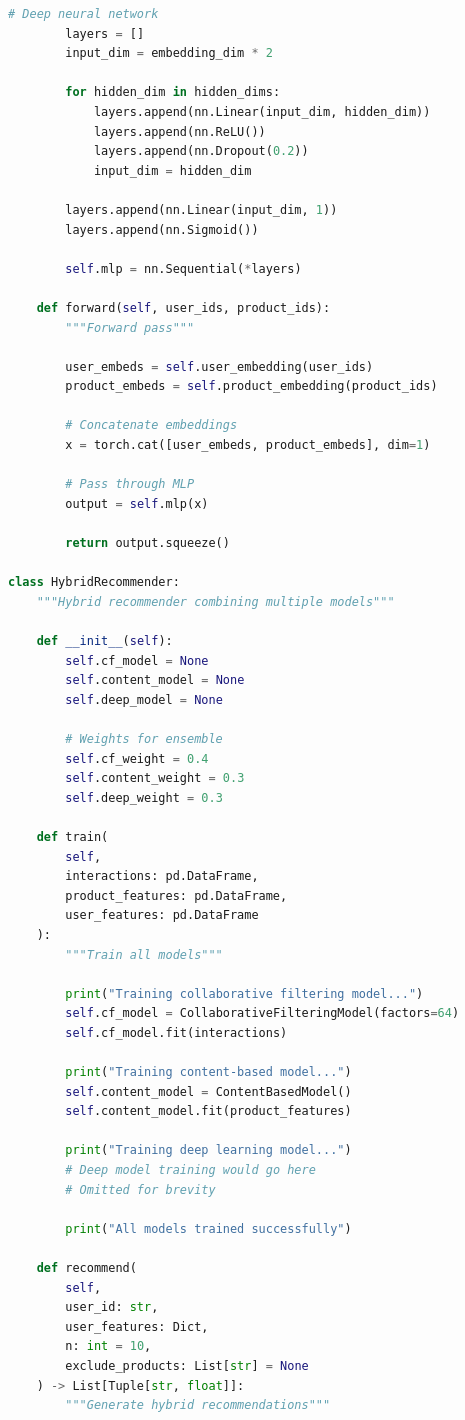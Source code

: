 \begin{lstlisting}[language=Python, caption=Hybrid Recommendation Models]
        # Deep neural network
        layers = []
        input_dim = embedding_dim * 2

        for hidden_dim in hidden_dims:
            layers.append(nn.Linear(input_dim, hidden_dim))
            layers.append(nn.ReLU())
            layers.append(nn.Dropout(0.2))
            input_dim = hidden_dim

        layers.append(nn.Linear(input_dim, 1))
        layers.append(nn.Sigmoid())

        self.mlp = nn.Sequential(*layers)

    def forward(self, user_ids, product_ids):
        """Forward pass"""

        user_embeds = self.user_embedding(user_ids)
        product_embeds = self.product_embedding(product_ids)

        # Concatenate embeddings
        x = torch.cat([user_embeds, product_embeds], dim=1)

        # Pass through MLP
        output = self.mlp(x)

        return output.squeeze()

class HybridRecommender:
    """Hybrid recommender combining multiple models"""

    def __init__(self):
        self.cf_model = None
        self.content_model = None
        self.deep_model = None

        # Weights for ensemble
        self.cf_weight = 0.4
        self.content_weight = 0.3
        self.deep_weight = 0.3

    def train(
        self,
        interactions: pd.DataFrame,
        product_features: pd.DataFrame,
        user_features: pd.DataFrame
    ):
        """Train all models"""

        print("Training collaborative filtering model...")
        self.cf_model = CollaborativeFilteringModel(factors=64)
        self.cf_model.fit(interactions)

        print("Training content-based model...")
        self.content_model = ContentBasedModel()
        self.content_model.fit(product_features)

        print("Training deep learning model...")
        # Deep model training would go here
        # Omitted for brevity

        print("All models trained successfully")

    def recommend(
        self,
        user_id: str,
        user_features: Dict,
        n: int = 10,
        exclude_products: List[str] = None
    ) -> List[Tuple[str, float]]:
        """Generate hybrid recommendations"""


\end{lstlisting}
